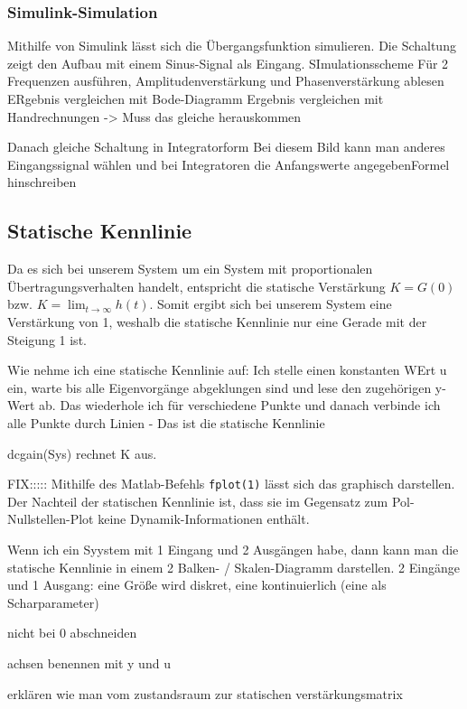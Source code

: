 \subsubsection{Simulink-Simulation}
Mithilfe von Simulink lässt sich die Übergangsfunktion simulieren. Die Schaltung zeigt den Aufbau mit einem Sinus-Signal als Eingang.
SImulationsscheme
Für 2 Frequenzen ausführen, Amplitudenverstärkung und Phasenverstärkung ablesen
ERgebnis vergleichen mit Bode-Diagramm
Ergebnis vergleichen mit Handrechnungen  -> Muss das gleiche herauskommen

Danach gleiche Schaltung in Integratorform
Bei diesem Bild kann man anderes Eingangssignal wählen und bei Integratoren die Anfangswerte angegebenFormel hinschreiben

\subsection{Statische Kennlinie}

Da es sich bei unserem System um ein System mit proportionalen Übertragungsverhalten handelt, entspricht die statische Verstärkung $K = G(0)$ bzw. $K = \lim_{t\to \infty} h(t)$. 
Somit ergibt sich bei unserem System eine Verstärkung von 1, weshalb die statische Kennlinie nur eine Gerade mit der Steigung 1 ist. 

Wie nehme ich eine statische Kennlinie auf: Ich stelle einen konstanten WErt u ein, warte bis alle Eigenvorgänge abgeklungen sind und lese den zugehörigen y-Wert ab. Das wiederhole ich für verschiedene Punkte und danach verbinde ich alle Punkte durch Linien - Das ist die statische Kennlinie

dcgain(Sys) rechnet K aus.

FIX:::::
Mithilfe des Matlab-Befehls \texttt{fplot(1)} lässt sich das graphisch darstellen. Der Nachteil der statischen Kennlinie ist, dass sie im Gegensatz zum Pol-Nullstellen-Plot keine Dynamik-Informationen enthält.


Wenn ich ein Syystem mit 1 Eingang und 2 Ausgängen habe, dann kann man die statische Kennlinie in einem 2 Balken- / Skalen-Diagramm darstellen.
2 Eingänge und 1 Ausgang: eine Größe wird diskret, eine kontinuierlich (eine als Scharparameter)

nicht bei 0 abschneiden

achsen benennen mit y und u

erklären wie man vom zustandsraum zur statischen verstärkungsmatrix

